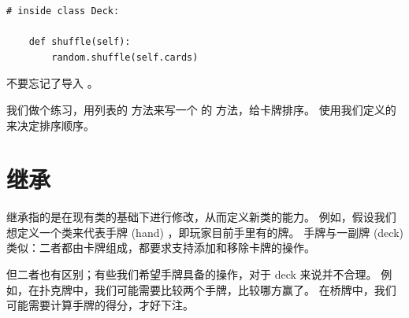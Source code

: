 \begin{lstlisting}
# inside class Deck:

    def shuffle(self):
        random.shuffle(self.cards)
\end{lstlisting}


不要忘记了导入  。


我们做个练习，用列表的  方法来写一个  的  方法，给卡牌排序。
  使用我们定义的  来决定排序顺序。

 


\section{继承}



继承指的是在现有类的基础下进行修改，从而定义新类的能力。
例如，假设我们想定义一个类来代表手牌 (hand) ，即玩家目前手里有的牌。
手牌与一副牌 (deck)类似：二者都由卡牌组成，都要求支持添加和移除卡牌的操作。


但二者也有区别；有些我们希望手牌具备的操作，对于 deck 来说并不合理。
例如，在扑克牌中，我们可能需要比较两个手牌，比较哪方赢了。
在桥牌中，我们可能需要计算手牌的得分，才好下注。

